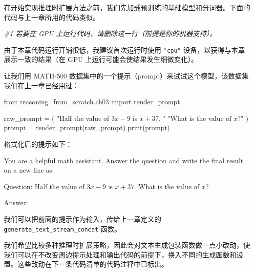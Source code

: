 在开始实现推理时扩展方法之前，我们先加载预训练的基础模型和分词器。下面的代码与上一章所用的代码类似。

{\noindent\small\textit{\#1 若要在 GPU 上运行代码，请删除这一行（前提是你的机器支持）。}\par}

由于本章代码运行开销很低，我建议首次运行时使用 \texttt{"}\texttt{cpu}\texttt{"} 设备，以获得与本章展示一致的结果（在 GPU 上运行可能会使结果发生细微变化）。

让我们用 MATH-500 数据集中的一个提示（prompt）来试试这个模型，该数据集我们在上一章已经用过：

\begin{codebox}
from reasoning_from_scratch.ch03 import render_prompt

raw_prompt = (
    "Half the value of $3x-9$ is $x+37$. "
    "What is the value of $x$?"
)
prompt = render_prompt(raw_prompt)
print(prompt)
\end{codebox}

格式化后的提示如下：

\begin{codebox}
You are a helpful math assistant.
Answer the question and write the final result on a new line as:

Question:
Half the value of $3x-9$ is $x+37$. What is the value of $x$?

Answer:
\end{codebox}

我们可以把前面的提示作为输入，传给上一章定义的 \texttt{generate\_text\_stream\_concat} 函数。

我们希望比较多种推理时扩展策略，因此会对文本生成包装函数做一点小改动，使我们可以在不改变周边提示处理和输出代码的前提下，换入不同的生成函数和设置。这些改动在下一条代码清单的代码注释中已标出。


